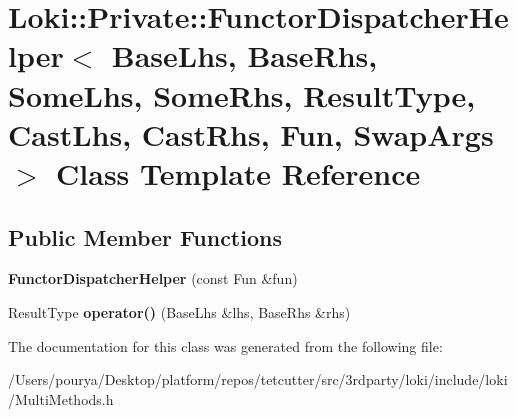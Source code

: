 \hypertarget{classLoki_1_1Private_1_1FunctorDispatcherHelper}{}\section{Loki\+:\+:Private\+:\+:Functor\+Dispatcher\+Helper$<$ Base\+Lhs, Base\+Rhs, Some\+Lhs, Some\+Rhs, Result\+Type, Cast\+Lhs, Cast\+Rhs, Fun, Swap\+Args $>$ Class Template Reference}
\label{classLoki_1_1Private_1_1FunctorDispatcherHelper}
\subsection*{Public Member Functions}
\begin{DoxyCompactItemize}
\item 
\hypertarget{classLoki_1_1Private_1_1FunctorDispatcherHelper_a162a7a707a38bd173a6a4cbf28e57327}{}{\bfseries Functor\+Dispatcher\+Helper} (const Fun \&fun)\label{classLoki_1_1Private_1_1FunctorDispatcherHelper_a162a7a707a38bd173a6a4cbf28e57327}

\item 
\hypertarget{classLoki_1_1Private_1_1FunctorDispatcherHelper_a616aade646186b25fe6bb0c81a593624}{}Result\+Type {\bfseries operator()} (Base\+Lhs \&lhs, Base\+Rhs \&rhs)\label{classLoki_1_1Private_1_1FunctorDispatcherHelper_a616aade646186b25fe6bb0c81a593624}

\end{DoxyCompactItemize}


The documentation for this class was generated from the following file\+:\begin{DoxyCompactItemize}
\item 
/\+Users/pourya/\+Desktop/platform/repos/tetcutter/src/3rdparty/loki/include/loki/Multi\+Methods.\+h\end{DoxyCompactItemize}
